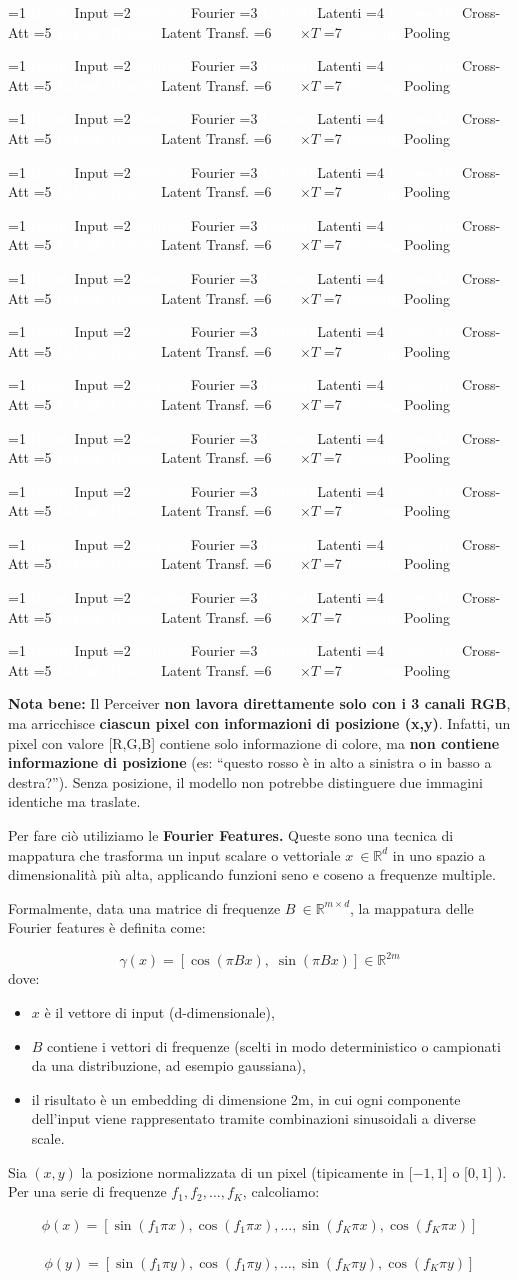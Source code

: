 \documentclass[
  11pt,
]{article}
\newcommand{\pipelinestep}[2]{%
  \ifnum#2=1
    \tikz[baseline=(n.base)]{\node[draw=seccolor, fill=seccolor!15, rounded corners=2pt,
      inner sep=2pt, font=\footnotesize\bfseries] (n) {#1};}%
  \else
    \tikz[baseline=(n.base)]{\node[draw=boxframe, rounded corners=2pt,
      inner sep=2pt, font=\footnotesize] (n) {#1};}%
  \fi
}
\newcommand{\parr}{{\footnotesize\;$\to$\;}}
\newcommand{\pipeline}[1]{%
\begin{tcolorbox}[colback=white, colframe=seccolor!60, boxrule=0.6pt, arc=4pt,
  left=4pt, right=4pt, top=5pt, bottom=5pt, title={\footnotesize\bfseries\color{white} Forward Pass Pipeline}, fonttitle=\footnotesize, coltitle=white, colbacktitle=seccolor!70]
\centering
\pipelinestep{Input}{%
  \ifnum#1=1 1\else 0\fi}%
\parr\pipelinestep{Fourier}{%
  \ifnum#1=2 1\else 0\fi}%
\parr\pipelinestep{Embedding}{%
  \ifnum#1=3 1\else 0\fi}%
\parr\pipelinestep{Latent Array}{%
  \ifnum#1=4 1\else 0\fi}%
\parr\pipelinestep{Cross-Att}{%
  \ifnum#1=5 1\else 0\fi}%
\parr\pipelinestep{Res+MLP}{%
  \ifnum#1=6 1\else 0\fi}%
\\[4pt]
\pipelinestep{Latent Transf.}{%
  \ifnum#1=7 1\else 0\fi}%
\parr\pipelinestep{Res+MLP}{%
  \ifnum#1=8 1\else 0\fi}%
\parr\pipelinestep{$\times T$}{%
  \ifnum#1=9 1\else 0\fi}%
\parr\pipelinestep{Pooling}{%
  \ifnum#1=10 1\else 0\fi}%
\parr\pipelinestep{Classifier}{%
  \ifnum#1=11 1\else 0\fi}%
\parr\pipelinestep{Loss}{%
  \ifnum#1=12 1\else 0\fi}%
\end{tcolorbox}
}
\newcommand{\mystripchip}[3]{%
  \setlength{\fboxsep}{2.8pt}%
  \ifnum#3=#1\relax
    \colorbox{seccolor}{\textcolor{white}{\bfseries #2}}%
  \else
    \colorbox{seccolor!8}{\textcolor{seccolor!55}{#2}}%
  \fi}
\newcommand{\mystriparr}{{\fontsize{8}{8}\selectfont\;\textcolor{seccolor!45}{$\rightarrow$}\;}}
\newcommand{\mystrip}[1]{%
\begin{center}
{\sffamily\fontsize{7.5}{9}\selectfont
\mystripchip{1}{Input}{#1}\mystriparr\mystripchip{2}{Fourier}{#1}\mystriparr\mystripchip{3}{Latenti}{#1}\mystriparr%
\mystripchip{4}{Cross-Att}{#1}\mystriparr\mystripchip{5}{Latent Transf.}{#1}\mystriparr%
\mystripchip{6}{$\times T$}{#1}\mystriparr\mystripchip{7}{Pooling}{#1}}
\end{center}}
\renewcommand{\pipeline}[1]{%
  \ifcase#1\relax
    \mystrip{0}%
    \or\mystrip{1}%
    \or\mystrip{2}%
    \or\mystrip{2}%
    \or\mystrip{3}%
    \or\mystrip{4}%
    \or\mystrip{4}%
    \or\mystrip{5}%
    \or\mystrip{5}%
    \or\mystrip{6}%
    \or\mystrip{7}%
    \or\mystrip{7}%
    \or\mystrip{7}%
  \fi}
\begin{document}
\pipeline{2}

\textbf{Nota bene:} Il Perceiver \textbf{non lavora direttamente solo con i
3 canali RGB}, ma arricchisce \textbf{ciascun pixel con informazioni} \textbf{di
posizione (x,y)}. Infatti, un pixel con valore {[}R,G,B{]} contiene solo
informazione di colore, ma \textbf{non contiene informazione di
posizione} (es: ``questo rosso è in alto a sinistra o in basso a
destra?''). Senza posizione, il modello non potrebbe distinguere due
immagini identiche ma traslate.

Per fare ciò utiliziamo le \textbf{Fourier Features.} Queste sono una
tecnica di mappatura che trasforma un input scalare o vettoriale
\(x\  \in \mathbb{R}^{d}\) in uno spazio a dimensionalità più alta,
applicando funzioni seno e coseno a frequenze multiple.

Formalmente, data una matrice di frequenze
\(B\  \in \mathbb{R}^{m \times d}\), la mappatura delle Fourier features
è definita come:

\[
\gamma(x) = \left[ \cos(\pi B x),\; \sin(\pi B x) \right] \in \mathbb{R}^{2m}
\]dove:

\begin{itemize}
\item
  \(x\) è il vettore di input (d-dimensionale),
\item
  \(B\) contiene i vettori di frequenze (scelti in modo deterministico o
  campionati da una distribuzione, ad esempio gaussiana),
\item
  il risultato è un embedding di dimensione 2m, in cui ogni componente
  dell'input viene rappresentato tramite combinazioni sinusoidali a
  diverse scale.
\end{itemize}

Sia \((x,y)\) la posizione normalizzata di un pixel (tipicamente in
\(\lbrack - 1,1\rbrack \text{ o } \lbrack 0,1\rbrack\) ).\\
Per una serie di frequenze \(f_{1},f_{2},\ldots,f_{K}\), calcoliamo:

\[\begin{matrix}
\phi(x) = \left\lbrack \sin\left( f_{1}\pi x \right),\cos\left( f_{1}\pi x \right),\ldots,\sin\left( f_{K}\pi x \right),\cos\left( f_{K}\pi x \right) \right\rbrack \\

\end{matrix}\]

\[\phi(y) = \left\lbrack \sin\left( f_{1}\pi y \right),\cos\left( f_{1}\pi y \right),\ldots,\sin\left( f_{K}\pi y \right),\cos\left( f_{K}\pi y \right) \right\rbrack\]
\end{document}
